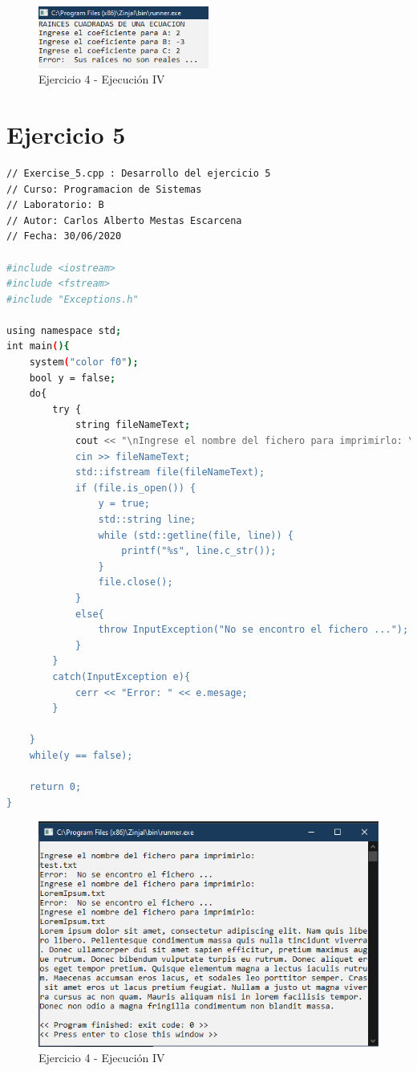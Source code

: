 \documentclass[12pt]{article}
\begin{document}
\begin{figure}[h]
    \centering
    \includegraphics[width=0.5\textwidth]{images/Capture04D.PNG}
    \caption{Ejercicio 4 - Ejecución IV}
\end{figure}

\clearpage
\newpage

\section{Ejercicio 5}

\begin{lstlisting}[language=bash,frame=single,style=CStyle]
// Exercise_5.cpp : Desarrollo del ejercicio 5
// Curso: Programacion de Sistemas
// Laboratorio: B
// Autor: Carlos Alberto Mestas Escarcena
// Fecha: 30/06/2020

#include <iostream>
#include <fstream>
#include "Exceptions.h"

using namespace std;
int main(){
	system("color f0");
	bool y = false;
	do{
		try	{
			string fileNameText;
			cout << "\nIngrese el nombre del fichero para imprimirlo: \n";
			cin >> fileNameText;
			std::ifstream file(fileNameText);
			if (file.is_open()) {
				y = true;
				std::string line;
				while (std::getline(file, line)) {
					printf("%s", line.c_str());
				}
				file.close();
			}
			else{
				throw InputException("No se encontro el fichero ...");
			}
		}
		catch(InputException e){
			cerr <<	"Error:	" << e.mesage;	
		}
		
	}
	while(y == false);
	
	return 0;
}
\end{lstlisting}

\begin{figure}[h]
    \centering
    \includegraphics[width=1\textwidth]{images/Capture05A.PNG}
    \caption{Ejercicio 4 - Ejecución IV}
\end{figure}
\end{document}

